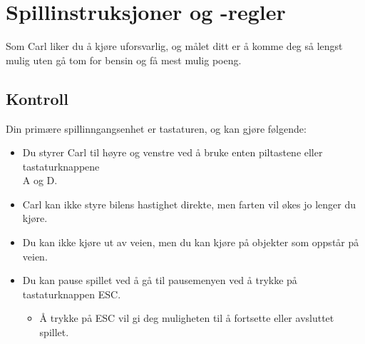 \documentclass[paper=a4]{article}
\begin{document}
\section{Spillinstruksjoner og -regler} 
Som Carl liker du å kjøre uforsvarlig, og målet ditt er å komme deg så lengst mulig uten gå tom for bensin og få mest mulig poeng. \\

\subsection{Kontroll} 
Din primære spillinngangsenhet er tastaturen, og kan gjøre følgende: 
\begin{itemize}
	\item Du styrer Carl til høyre og venstre ved å bruke enten piltastene eller tastaturknappene \\ A og D. \\ 
	\item Carl kan ikke styre bilens hastighet direkte, men farten vil økes jo lenger du kjøre.
	\item Du kan ikke kjøre ut av veien, men du kan kjøre på objekter som oppstår på veien.
	\item Du kan pause spillet ved å gå til pausemenyen ved å trykke på tastaturknappen ESC. 
	\begin{itemize}
		\item Å trykke på ESC vil gi deg muligheten til å fortsette eller avsluttet spillet.
	\end{itemize}
\end{itemize}
\end{document}

